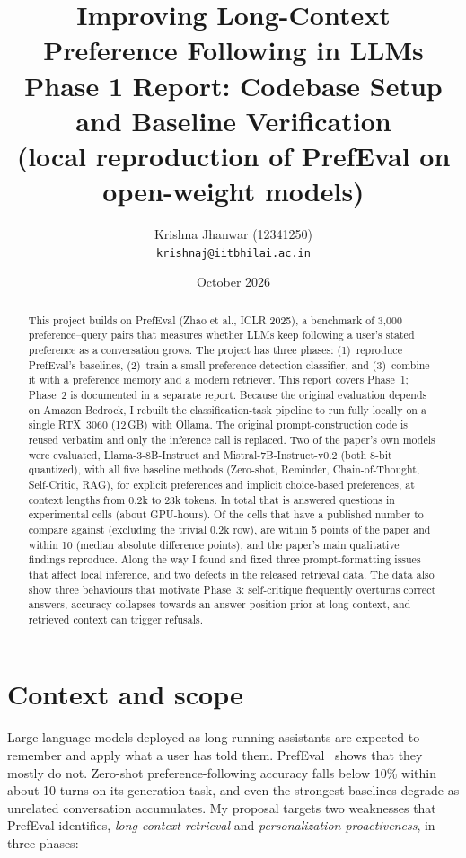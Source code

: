 \documentclass[11pt,a4paper]{article}
\title{\textbf{Improving Long-Context Preference Following in LLMs}\\[2pt]
\large Phase 1 Report: Codebase Setup and Baseline Verification\\
(local reproduction of PrefEval on open-weight models)}
\author{Krishna Jhanwar (12341250)\\ \small\texttt{krishnaj@iitbhilai.ac.in}}
\date{October 2026}
\begin{document}
\maketitle

\begin{abstract}
\noindent
This project builds on PrefEval (Zhao et al., ICLR 2025), a benchmark of 3{,}000 preference--query pairs that measures
whether LLMs keep following a user's stated preference as a conversation grows. The project has three phases: (1)~reproduce
PrefEval's baselines, (2)~train a small preference-detection classifier, and (3)~combine it with a preference memory and a modern
retriever. This report covers Phase~1; Phase~2 is documented in a separate report. Because the original evaluation depends on Amazon Bedrock, I rebuilt
the classification-task pipeline to run fully locally on a single RTX~3060 (12\,GB) with Ollama. The original prompt-construction
code is reused verbatim and only the inference call is replaced. Two of the paper's own models were evaluated,
Llama-3-8B-Instruct and Mistral-7B-Instruct-v0.2 (both 8-bit quantized), with all five baseline methods (Zero-shot, Reminder,
Chain-of-Thought, Self-Critic, RAG), for explicit preferences and implicit choice-based preferences, at context lengths from
0.2k to 23k tokens. In total that is \nQuestions{} answered questions in \nCells{} experimental cells (about \gpuHours{} GPU-hours).
Of the \nCompared{} cells that have a published number to compare against (excluding the trivial 0.2k row), \nWithinFive{} are within
5 points of the paper and \nWithinTen{} within 10 (median absolute difference \medianAbsDelta{} points), and the paper's main
qualitative findings reproduce. Along the way I found and fixed three prompt-formatting issues that affect local inference, and two
defects in the released retrieval data. The data also show three behaviours that motivate Phase~3: self-critique frequently
overturns correct answers, accuracy collapses towards an answer-position prior at long context, and retrieved context can
trigger refusals.
\end{abstract}


\section{Context and scope}

Large language models deployed as long-running assistants are expected to remember and apply what a user has told them.
PrefEval~\cite{prefeval} shows that they mostly do not. Zero-shot preference-following accuracy falls below 10\% within about
10 turns on its generation task, and even the strongest baselines degrade as unrelated conversation accumulates.
My proposal targets two weaknesses that PrefEval identifies, \emph{long-context retrieval} and \emph{personalization
proactiveness}, in three phases:
\end{document}
